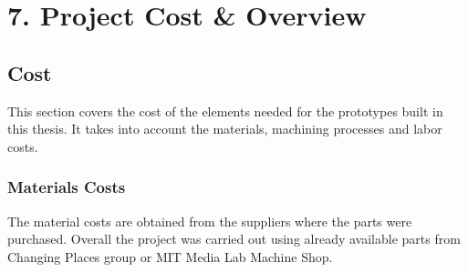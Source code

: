 \chapter{7. Project Cost \& Overview}

\section{Cost}

This section covers the cost of the elements needed for the prototypes built in this thesis. It takes into account the materials, machining processes and labor costs.

\subsection{Materials Costs}

The material costs are obtained from the suppliers where the parts were purchased. Overall the project was carried out using already available parts from Changing Places group or MIT Media Lab Machine Shop.

